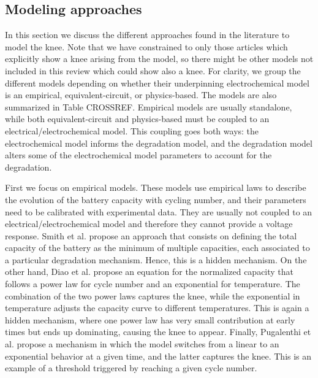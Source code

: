 \documentclass[journal=jpclcd,manuscript=article]{achemso}
\begin{document}


\subsection{Modeling approaches}
In this section we discuss the different approaches found in the literature to model the knee. Note that we have constrained to only those articles which explicitly show a knee arising from the model, so there might be other models not included in this review which could show also a knee. For clarity, we group the different models depending on whether their underpinning electrochemical model is an empirical, equivalent-circuit, or physics-based. The models are also summarized in Table {\color{red} CROSSREF}. Empirical models are usually standalone, while both equivalent-circuit and physics-based must be coupled to an electrical/electrochemical model. This coupling goes both ways: the electrochemical model informs the degradation model, and the degradation model alters some of the electrochemical model parameters to account for the degradation. 

First we focus on empirical models. These models use empirical laws to describe the evolution of the battery capacity with cycling number, and their parameters need to be calibrated with experimental data. They are usually not coupled to an electrical/electrochemical model and therefore they cannot provide a voltage response. Smith et al. \cite{smith_models_2014,smith_life_2017} propose an approach that consists on defining the total capacity of the battery as the minimum of multiple capacities, each associated to a particular degradation mechanism. Hence, this is a hidden mechanism. On the other hand, Diao et al. \cite{diao_accelerated_2019} propose an equation for the normalized capacity that follows a power law for cycle number and an exponential for temperature. The combination of the two power laws captures the knee, while the exponential in temperature adjusts the capacity curve to different temperatures. This is again a hidden mechanism, where one power law has very small contribution at early times but ends up dominating, causing the knee to appear. Finally, Pugalenthi et al. \cite{pugalenthi_piecewise_2020} propose a mechanism in which the model switches from a linear to an exponential behavior at a given time, and the latter captures the knee. This is an example of a threshold triggered by reaching a given cycle number.
\end{document}
